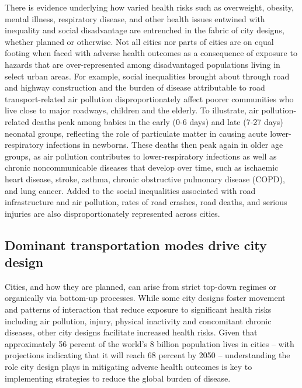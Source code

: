 \documentclass[preprint,10pt]{elsarticle} %
\begin{document}
There is evidence underlying how varied health risks such as overweight, obesity, mental illness, respiratory disease, and other health issues entwined with inequality and social disadvantage are entrenched in the fabric of city designs, whether planned or otherwise\cite{borrell2013factors,xing2016impact,yuchi2020road}. Not all cities nor parts of cities are on equal footing when faced with adverse health outcomes as a consequence of exposure to hazards that are over-represented among disadvantaged populations living in select urban areas\cite{KRISHNA2021102046}. For example, social inequalities brought about through road and highway construction\cite{carpenter2010poverty,archer2020white} and the burden of disease attributable to road transport-related air pollution disproportionately affect poorer communities who live close to major roadways, children and the elderly. To illustrate, air pollution-related deaths peak among babies in the early (0-6 days) and late (7-27 days) neonatal groups, reflecting the role of particulate matter in causing acute lower-respiratory infections in newborns. These deaths then peak again in older age groups, as air pollution contributes to lower-respiratory infections as well as chronic noncommunicable diseases that develop over time, such as ischaemic heart disease, stroke, asthma, chronic obstructive pulmonary disease (COPD), and lung cancer\cite{boogaard2022long}. Added to the social inequalities associated with road infrastructure and air pollution, rates of road crashes, road deaths, and serious injuries are also disproportionately represented across cities\cite{Thompson2020}.

\subsection*{Dominant transportation modes drive city design}
Cities, and how they are planned, can arise from strict top-down regimes\cite{mundigo1977city} or organically via bottom-up processes\cite{batty2017thinking}. While some city designs foster movement and patterns of interaction that reduce exposure to significant health risks including air pollution, injury, physical inactivity and concomitant chronic diseases, other city designs facilitate increased health risks\cite{Wijnands2022, Stevenson2016,wang2023flood, stanley2022managing}. Given that approximately 56 percent of the world's 8 billion population lives in cities -- with projections indicating that it will reach 68 percent by 2050\cite{WHO2023}  -- understanding the role city design plays in mitigating adverse health outcomes is key to implementing strategies to reduce the global burden of disease. 
\end{document}
